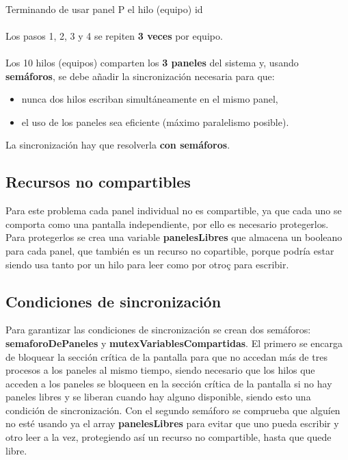 \documentclass[a4paper,12pt,titlepage,oneside]{article}
\begin{document}
\begin{enumerate}[label=\arabic*)]
{        \\
        Terminando de usar panel P el hilo (equipo) id \\
        \\ }
        Los pasos 1, 2, 3 y 4 se repiten \textbf{3 veces} por equipo. \\
        \\
        Los 10 hilos (equipos) comparten los \textbf{3 paneles} del sistema y, usando \textbf{semáforos}, se debe 
        añadir la sincronización necesaria para que: 
        \begin{itemize}
            \item nunca dos hilos escriban simultáneamente en el mismo panel, 
            \item el uso de los paneles sea eficiente (máximo paralelismo posible). 
        \end{itemize}
        La sincronización hay que resolverla \textbf{con semáforos}.
    \end{enumerate}
    \fi
    \subsection{Recursos no compartibles}
    Para este problema cada panel individual no es compartible, ya que cada uno se comporta como una pantalla
    independiente, por ello es necesario protegerlos.
    Para protegerlos se crea una variable \textbf{panelesLibres} que almacena un booleano para cada panel, que 
    también es un recurso no copartible, porque podría estar siendo usa tanto por un hilo para leer como por otroç
    para escribir.
    \subsection{Condiciones de sincronización}
    Para garantizar las condiciones de sincronización se crean dos semáforos: \textbf{semaforoDePaneles} y 
    \textbf{mutexVariablesCompartidas}. El primero se encarga de bloquear la sección crítica de la pantalla para 
    que no accedan más de tres procesos a los paneles al mismo tiempo, siendo necesario que los hilos que acceden
    a los paneles se bloqueen en la sección crítica de la pantalla si no hay paneles libres y se liberan cuando
    hay alguno disponible, siendo esto una condición de sincronización. Con el segundo semáforo se comprueba que
    alguíen no esté usando ya el array \textbf{panelesLibres} para evitar que uno pueda escribir y otro leer a la 
    vez, protegiendo así un recurso no compartible, hasta que quede libre.
    \newpage
\end{document}
